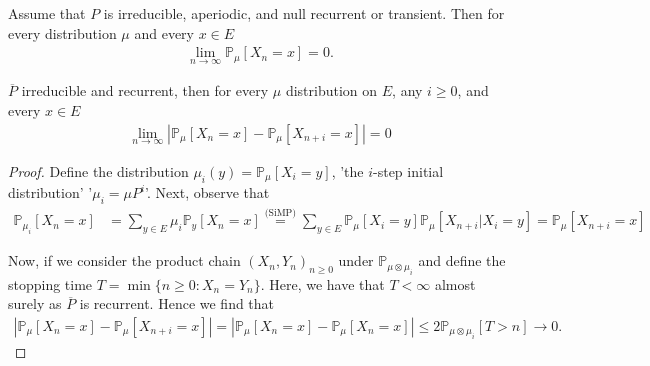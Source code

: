 \begin{theorem}[]
	Assume that $P$ is irreducible, aperiodic, and null recurrent or transient. Then for every distribution $\mu $ and every $x \in E$  
	\begin{align}
\boxed{	\lim_{n \to \infty}\mathbb{P}_{\mu } \left[ X_n =x \right] = 0 }
.	\end{align}
	
\end{theorem}
\begin{lemma}[]
	$\overline{P}$ irreducible and recurrent, then for every $\mu $ distribution on $E$, any $i\geq 0$, and every $x \in E$
	\begin{align}
	\lim_{n \to \infty} | \mathbb{P}_{\mu } \left[ X_n=x \right] - \mathbb{P}_{\mu } \left[ X_{n+i}=x \right] | = 0
	\end{align}
\end{lemma}
\begin{proof}
	Define the distribution $\mu_i(y) = \mathbb{P}_{\mu } \left[ X_i = y \right] $, {\color{blue}'the $i$-step initial distribution'} '$\mu_i=\mu P^i$'. Next, observe that
\begin{align}
	\mathbb{P}_{\mu _i} \left[ X_n = x \right] &= \sum_{y \in E}^{} \mu _i \mathbb{P}_{y} \left[ X_n = x \right] 
	\stackrel{\textrm{(SiMP)}}{=} \sum_{y \in E}^{} \mathbb{P}_{\mu } \left[ X_i = y \right] \mathbb{P}_{\mu } \left[ X_{n+i} | X_i = y\right] 
	= \mathbb{P}_{\mu } \left[ X_{n+i}=x \right] 
\end{align}

Now, if we consider the product chain $(X_n, Y_n)_{n\geq 0}$ under $\mathbb{P}_{\mu \otimes \mu_i} $ and define the stopping time $T= \min\{n\geq 0: X_n = Y_n\}$. Here, we have that $T<\infty$ almost surely as $\overline{P}$ is recurrent. Hence we find that
\begin{align}
	\left| \mathbb{P}_{\mu } \left[ X_n = x \right] - \mathbb{P}_{\mu } \left[ X_{n+i} = x \right] \right|
	= \left| \mathbb{P}_{\mu } \left[ X_n = x \right] - \mathbb{P}_{\mu} \left[ X_n = x \right] \right| 
	\leq 2  \mathbb{P}_{\mu \otimes \mu _i} \left[ T>n \right]  \to 0.
\end{align}
\end{proof}
